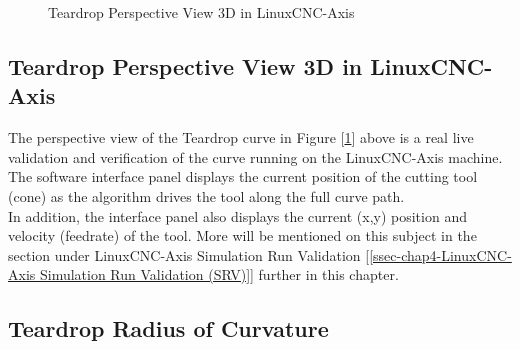 \begin{figure}
	\caption  {Teardrop Perspective View 3D in LinuxCNC-Axis}
	\label{img-chap4-Teardrop-Perspective-View-3D-from-LinuxCNC-Axis.pdf}
	\centering
\end{figure}

\subsection{Teardrop Perspective View 3D in LinuxCNC-Axis} 
\label{ssec-chap4-Teardrop Perspective View 3D in LinuxCNC-Axis }

The perspective view of the Teardrop curve in Figure [\ref{img-chap4-Teardrop-Perspective-View-3D-from-LinuxCNC-Axis.pdf}] above is a real live validation and verification of the curve running on the LinuxCNC-Axis machine. The software interface panel displays the current position of the cutting tool (cone) as the algorithm drives the tool along the full curve path. \\

In addition, the interface panel also displays the current (x,y) position and velocity (feedrate) of the tool. More will be mentioned on this subject in the section under LinuxCNC-Axis Simulation Run Validation [\ref{ssec-chap4-LinuxCNC-Axis Simulation Run Validation (SRV)}] further in this chapter.


\clearpage
\pagebreak

\subsection{Teardrop Radius of Curvature} 
\label{ssec-chap4-Teardrop Radius of Curvature} 

